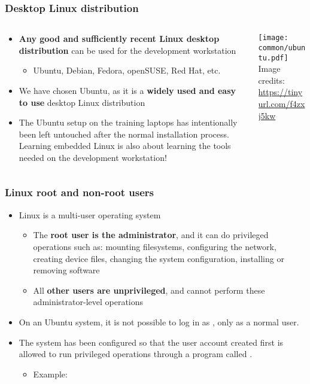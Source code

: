 \begin{frame}
  \frametitle{Desktop Linux distribution}
  \begin{columns}
    \begin{column}{0.7\textwidth}
    \begin{itemize}
    \item {\bf Any good and sufficiently recent Linux desktop
        distribution} can be used for the development workstation
      \begin{itemize}
      \item Ubuntu, Debian, Fedora, openSUSE, Red Hat, etc.
      \end{itemize}
    \item We have chosen Ubuntu, as it is a {\bf widely used and easy to
        use} desktop Linux distribution
    \item The Ubuntu setup on the training laptops has intentionally
      been left untouched after the normal installation
      process. Learning embedded Linux is also about learning the tools
      needed on the development workstation!
    \end{itemize}
    \end{column}
    \begin{column}[t]{0.3\textwidth}
      \texttt{[image: common/ubuntu.pdf]}\\
      \tiny Image credits: \url{https://tinyurl.com/f4zxj5kw}
    \end{column}
  \end{columns}
\end{frame}

\begin{frame}
  \frametitle{Linux root and non-root users}
  \begin{itemize}
  \item Linux is a multi-user operating system
    \begin{itemize}
    \item The {\bf root user is the administrator}, and it can do
      privileged operations such as: mounting filesystems, configuring
      the network, creating device files, changing the system
      configuration, installing or removing software
    \item All {\bf other users are unprivileged}, and cannot perform
      these administrator-level operations
    \end{itemize}
  \item On an Ubuntu system, it is not possible to log in as
    , only as a normal user.
  \item The system has been configured so that the user account
    created first is allowed to run privileged operations through a
    program called .\\
    \begin{itemize}
    \item Example: 
    \end{itemize}
  \end{itemize}
\end{frame}

